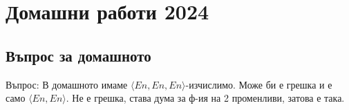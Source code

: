 \section{Домашни работи 2024}
\subsection{Въпрос за домашното}
Въпрос: В домашното имаме $\langle En, En, En \rangle$-изчислимо. Може би е грешка и е само $\langle En, En \rangle$. Не е грешка, става дума за ф-ия на 2 променливи, затова е така.
% 
% 
% 
% 
% 
% 

% 
% 